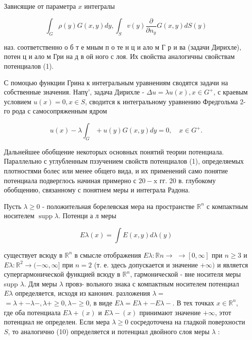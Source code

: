 \documentclass[10pt]{article}
\begin{document}
Зависящие от параметра $x$ интегралы



\[

\int_{G} \rho(y) G(x, y) d y, \int_{S} v(y) \frac{\partial}{\partial n_{y}} G(x, y) d S(y)

\]



наз. соответственно о б т е мным п о те н ц и ало м Г р и ва (задачи Дирихле), потен ц и ало м Гри на д в ой ного с лоя. Их свойства аналогичны свойствам потенциалов (1).



С помоцью функции Грина к интегральным уравнениям сводятся задачи на собственные значения. Напү', задача Дирихле - $\Delta u=\lambda u(x), x \in G^{+}$, с краевым условием $u(x)=0, x \in S$, сводится к интегральному уравнению Фредгольма 2-го рода с самосопряженным ядром



\[

u(x)-\lambda \int_{G}+u(y) G(x, y) d y=0, \quad x \in G^{+} .

\]



Дальнейшее обобщение некоторых основных понятий теории потенциала. Параллельно с углубленным пззучением свойств потенциалов (1), определяемых плотностями болес или менее общего вида, и их применений само понятие потенциала подверглось начиная примерно с $20-\mathrm{x}$ гг. 20 в. глубокому обобщению, связанному с понятием меры и интеграла Радона.



Пусть $\lambda \geqslant 0$ - положительная борелевская мера на пространстве $\mathbb{R}^{n}$ с компактным носителем $\operatorname{supp} \lambda$. Потенци а л меры



\[

E \lambda(x)=\int E(x, y) d \lambda(y)

\]



существует всюду в $\mathbb{R}^{n}$ в смысле отображения $E \lambda: \mathbb{R} n \rightarrow$ $\rightarrow[0, \infty]$ при $n \geqslant 3$ и $E \lambda: \mathbb{R}^{2} \rightarrow(-\infty, \infty]$ при $n=2$ (т. е. здесь допускается и значение $+\infty)$ и является супергармонической функцией всюду в $\mathbb{R}^{n}$, гармонической - вне носителя меры supp $\lambda$. Для меры $\lambda$ провз- вольного знака с компактным носителем потенциал $E \lambda$ определяется, исходя из канонич. разложения $\lambda=$ $=\lambda+-\lambda-, \lambda+\geqslant 0, \lambda-\geqslant 0$, в виде $E \lambda=E \lambda+-E \lambda-$. В тех точках $x \in \mathbb{R}^{n}$, где оба потенциала $E \lambda+(x)$ и $E \lambda-(x)$ принимают значение $+\infty$, этот потенциал не определен. Если мера $\lambda \geqslant 0$ сосредоточена на гладкой поверхности $S$, то аналогично (10) определяется и потенциал двойного слоя меры $\lambda$ :
\end{document}
